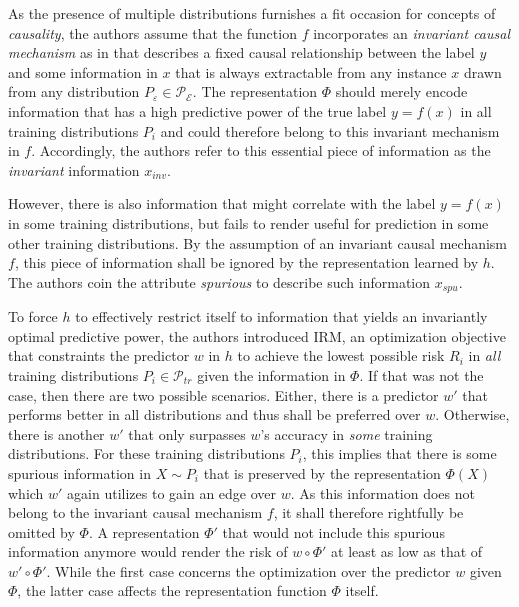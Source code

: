 As the presence of multiple distributions furnishes a fit occasion for concepts of \textit{causality}, the authors assume that the function $f$ incorporates an \textit{invariant causal mechanism} as in \cite[Section 4]{scholkopf2021toward} that describes a fixed causal relationship between the label $y$ and some information in $x$ that is always extractable from any instance $x$ drawn from any distribution $P_{\varepsilon}\in\mathcal{P}_{\mathcal{E}}$.
The representation $\Phi$ should merely encode information that has a high predictive power of the true label $y=f(x)$ in all training distributions $P_i$ and could therefore belong to this invariant mechanism in $f$.
Accordingly, the authors refer to this essential piece of information as the \textit{invariant} information $x_{inv}$.

However, there is also information that might correlate with the label $y=f(x)$ in some training distributions, but fails to render useful for prediction in some other training distributions.
By the assumption of an invariant causal mechanism $f$, this piece of information shall be ignored by the representation learned by $h$.
The authors coin the attribute \textit{spurious} to describe such information $x_{spu}$.


To force $h$ to effectively restrict itself to information that yields an invariantly optimal predictive power, the authors introduced IRM, an optimization objective that constraints the predictor $w$ in $h$ to achieve the lowest possible risk $R_i$ in \textit{all} training distributions $P_i\in\mathcal{P}_{tr}$ given the information in $\Phi$.
If that was not the case, then there are two possible scenarios. 
Either, there is a predictor $w'$ that performs better in all distributions and thus shall be preferred over $w$.
Otherwise, there is another $w'$ that only surpasses $w$'s accuracy in \textit{some} training distributions.
For these training distributions $P_i$, this implies that there is some spurious information in $X\sim P_i$ that is preserved by the representation $\Phi(X)$ which $w'$ again utilizes to gain an edge over $w$. 
As this information does not belong to the invariant causal mechanism $f$, it shall therefore rightfully be omitted by $\Phi$.
A representation $\Phi'$ that would not include this spurious information anymore would render the risk of $w\circ \Phi'$ at least as low as that of $w'\circ\Phi'$.
While the first case concerns the optimization over the predictor $w$ given $\Phi$, the latter case affects the representation function $\Phi$ itself.

